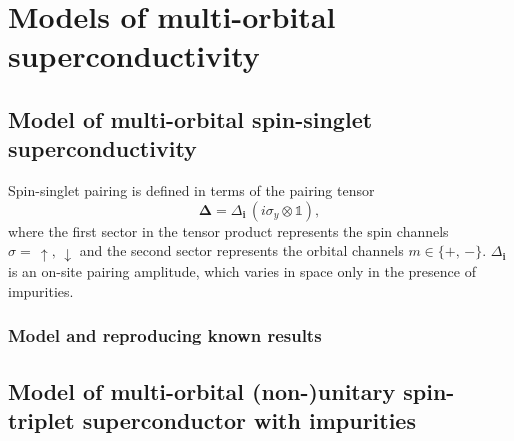 \chapter{\label{ch:multiorbital}Models of multi-orbital superconductivity}
\section{\label{sec:singlet_state}Model of multi-orbital spin-singlet superconductivity}
\graphicspath{{../gfx/section03/}{../plots/chapter03/}}


Spin-singlet pairing is defined in terms of the pairing tensor
\begin{equation}
\bm{\Delta}=\Delta_\mathbf{i}\,(i\sigma_y\otimes\mathbb{1}),
\end{equation}
where the first sector in the tensor product represents the spin channels $\sigma=\,\uparrow,\,\downarrow$ and the second sector represents the orbital channels $m\in\{+,\,-\}$. $\Delta_\mathbf{i}$ is an on-site pairing amplitude, which varies in space only in the presence of impurities.
\subsection{Model and reproducing known results}
\label{sec:reproducing_known_results}

\section{\label{sec:singlet_state}Model of multi-orbital (non-)unitary spin-triplet superconductor with impurities}
\graphicspath{{../gfx/section03/}{../plots/chapter03/}}


